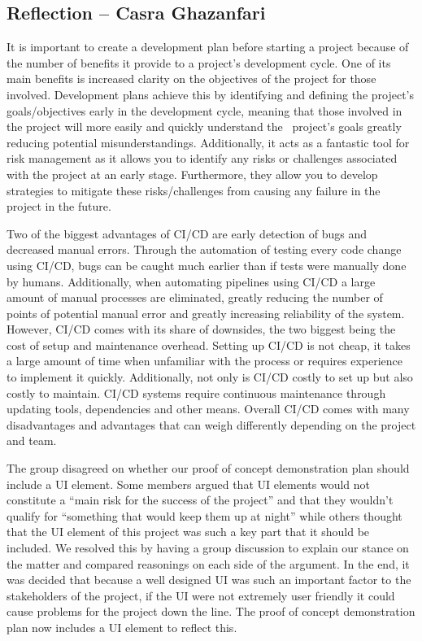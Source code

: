 \documentclass{article}
\begin{document}
\subsection*{Reflection -- Casra Ghazanfari}

It is important to create a development plan before starting a project because
of the number of benefits it provide to a project’s development cycle. One
of its main benefits is increased clarity on the objectives of the project
for those involved. Development plans achieve this by identifying and defining
the project’s goals/objectives early in the development cycle, meaning that
those involved in the project will more easily and quickly understand the \
project's goals greatly reducing potential misunderstandings. Additionally,
it acts as a fantastic tool for risk management as it allows you to identify
any risks or challenges associated with the project at an early stage.
Furthermore, they allow you to develop strategies to mitigate these
risks/challenges from causing any failure in the project in the future. \newline

Two of the biggest advantages of CI/CD are early detection of bugs and
decreased manual errors. Through the automation of testing every code change
using CI/CD, bugs can be caught much earlier than if tests were manually done
by humans. Additionally, when automating pipelines using CI/CD a large amount
of manual processes are eliminated, greatly reducing the number of points of
potential manual error and greatly increasing reliability of the system.
However, CI/CD comes with its share of downsides, the two biggest being the
cost of setup and maintenance overhead. Setting up CI/CD is not cheap, it takes
a large amount of time when unfamiliar with the process or requires experience to
implement it quickly. Additionally, not only is CI/CD costly to set up but
also costly to maintain. CI/CD systems require continuous maintenance through
updating tools, dependencies and other means. Overall CI/CD comes with many
disadvantages and advantages that can weigh differently depending on the project
and team. \newline

The group disagreed on whether our proof of concept demonstration plan should
include a UI element. Some members argued that UI elements would not constitute
a “main risk for the success of the project” and that they wouldn’t qualify for
“something that would keep them up at night” while others thought that the UI
element of this project was such a key part that it should be included. We
resolved this by having a group discussion to explain our stance on the matter
and compared reasonings on each side of the argument. In the end, it was decided
that because a well designed UI was such an important factor to the stakeholders
of the project, if the UI were not extremely user friendly it could cause
problems for the project down the line. The proof of concept demonstration plan
now includes a UI element to reflect this.
\end{document}
